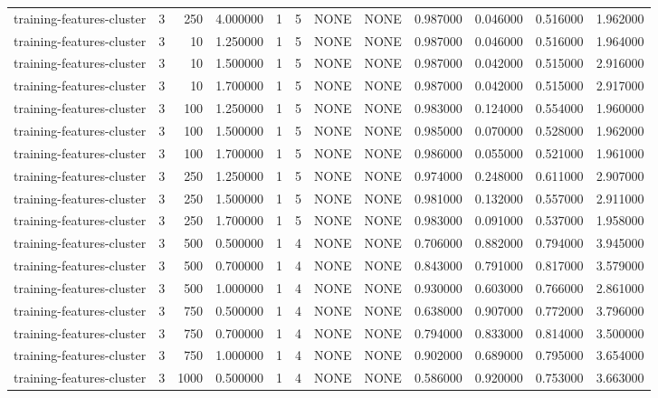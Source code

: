 \begin{tabular}{lrrrllllrrrr}
training-features-cluster & 3 & 250 & 4.000000 & 1 & 5 & NONE & NONE & 0.987000 & 0.046000 & 0.516000 & 1.962000 \\
training-features-cluster & 3 & 10 & 1.250000 & 1 & 5 & NONE & NONE & 0.987000 & 0.046000 & 0.516000 & 1.964000 \\
training-features-cluster & 3 & 10 & 1.500000 & 1 & 5 & NONE & NONE & 0.987000 & 0.042000 & 0.515000 & 2.916000 \\
training-features-cluster & 3 & 10 & 1.700000 & 1 & 5 & NONE & NONE & 0.987000 & 0.042000 & 0.515000 & 2.917000 \\
training-features-cluster & 3 & 100 & 1.250000 & 1 & 5 & NONE & NONE & 0.983000 & 0.124000 & 0.554000 & 1.960000 \\
training-features-cluster & 3 & 100 & 1.500000 & 1 & 5 & NONE & NONE & 0.985000 & 0.070000 & 0.528000 & 1.962000 \\
training-features-cluster & 3 & 100 & 1.700000 & 1 & 5 & NONE & NONE & 0.986000 & 0.055000 & 0.521000 & 1.961000 \\
training-features-cluster & 3 & 250 & 1.250000 & 1 & 5 & NONE & NONE & 0.974000 & 0.248000 & 0.611000 & 2.907000 \\
training-features-cluster & 3 & 250 & 1.500000 & 1 & 5 & NONE & NONE & 0.981000 & 0.132000 & 0.557000 & 2.911000 \\
training-features-cluster & 3 & 250 & 1.700000 & 1 & 5 & NONE & NONE & 0.983000 & 0.091000 & 0.537000 & 1.958000 \\
training-features-cluster & 3 & 500 & 0.500000 & 1 & 4 & NONE & NONE & 0.706000 & 0.882000 & 0.794000 & 3.945000 \\
training-features-cluster & 3 & 500 & 0.700000 & 1 & 4 & NONE & NONE & 0.843000 & 0.791000 & 0.817000 & 3.579000 \\
training-features-cluster & 3 & 500 & 1.000000 & 1 & 4 & NONE & NONE & 0.930000 & 0.603000 & 0.766000 & 2.861000 \\
training-features-cluster & 3 & 750 & 0.500000 & 1 & 4 & NONE & NONE & 0.638000 & 0.907000 & 0.772000 & 3.796000 \\
training-features-cluster & 3 & 750 & 0.700000 & 1 & 4 & NONE & NONE & 0.794000 & 0.833000 & 0.814000 & 3.500000 \\
training-features-cluster & 3 & 750 & 1.000000 & 1 & 4 & NONE & NONE & 0.902000 & 0.689000 & 0.795000 & 3.654000 \\
training-features-cluster & 3 & 1000 & 0.500000 & 1 & 4 & NONE & NONE & 0.586000 & 0.920000 & 0.753000 & 3.663000 \\

\end{tabular}
